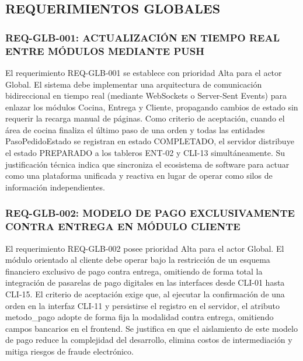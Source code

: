 \subsection{REQUERIMIENTOS GLOBALES}

\subsubsection{REQ-GLB-001: ACTUALIZACIÓN EN TIEMPO REAL ENTRE MÓDULOS MEDIANTE PUSH}
El requerimiento REQ-GLB-001 se establece con prioridad Alta para el actor Global. El sistema debe implementar una arquitectura de comunicación bidireccional en tiempo real (mediante WebSockets o Server-Sent Events) para enlazar los módulos Cocina, Entrega y Cliente, propagando cambios de estado sin requerir la recarga manual de páginas. Como criterio de aceptación, cuando el área de cocina finaliza el último paso de una orden y todas las entidades PasoPedidoEstado se registran en estado COMPLETADO, el servidor distribuye el estado PREPARADO a los tableros ENT-02 y CLI-13 simultáneamente. Su justificación técnica indica que sincroniza el ecosistema de software para actuar como una plataforma unificada y reactiva en lugar de operar como silos de información independientes.

\subsubsection{REQ-GLB-002: MODELO DE PAGO EXCLUSIVAMENTE CONTRA ENTREGA EN MÓDULO CLIENTE}
El requerimiento REQ-GLB-002 posee prioridad Alta para el actor Global. El módulo orientado al cliente debe operar bajo la restricción de un esquema financiero exclusivo de pago contra entrega, omitiendo de forma total la integración de pasarelas de pago digitales en las interfaces desde CLI-01 hasta CLI-15. El criterio de aceptación exige que, al ejecutar la confirmación de una orden en la interfaz CLI-11 y persistirse el registro en el servidor, el atributo metodo\_pago adopte de forma fija la modalidad contra entrega, omitiendo campos bancarios en el frontend. Se justifica en que el aislamiento de este modelo de pago reduce la complejidad del desarrollo, elimina costos de intermediación y mitiga riesgos de fraude electrónico.


